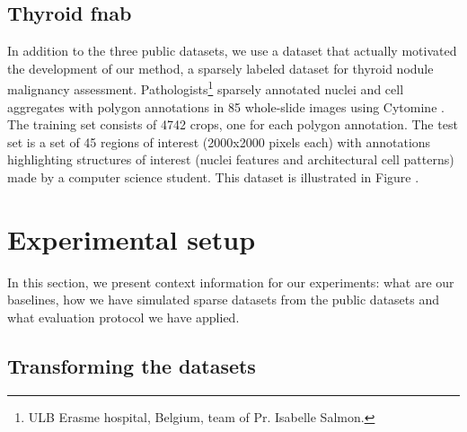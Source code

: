 \subsection{Thyroid \acrshort{fnab}}
\label{ssec:strain:thyroidfnab}

In addition to the three public datasets, we use a dataset that actually motivated the development of our method, a sparsely labeled dataset for thyroid nodule malignancy assessment. Pathologists\footnote{ULB Erasme hospital, Belgium, team of Pr. Isabelle Salmon.} sparsely annotated nuclei and cell aggregates with polygon annotations in 85 whole-slide images using Cytomine \parencite{maree2016collaborative}. The training set consists of 4742 crops, one for each polygon annotation. The test set is a set of 45 regions of interest (2000x2000 pixels each) with annotations highlighting structures of interest (nuclei features and architectural cell patterns) made by a computer science student. This dataset is illustrated in Figure .




\section{Experimental setup}
\label{sec:strain:experiments}

In this section, we present context information for our experiments: what are our baselines, how we have simulated sparse datasets from the public datasets and what evaluation protocol we have applied.

\subsection{Transforming the datasets}

